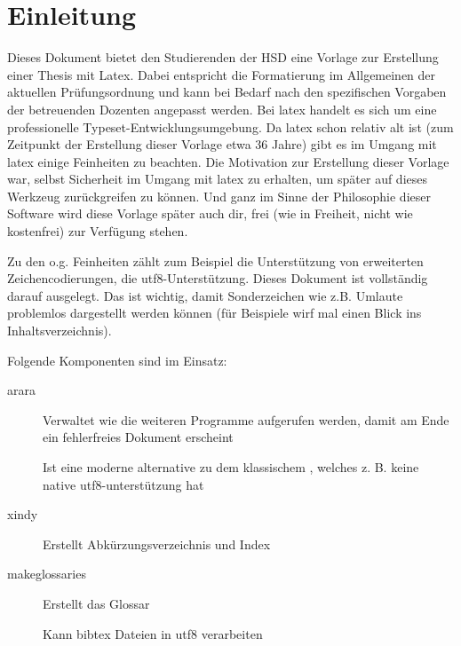 
\newpage

\section{Einleitung}%
\label{sec:einl}
Dieses Dokument bietet den Studierenden der HSD eine Vorlage zur Erstellung einer Thesis mit Latex. Dabei entspricht die Formatierung im Allgemeinen der aktuellen Prüfungsordnung und kann bei Bedarf nach den spezifischen Vorgaben der betreuenden Dozenten angepasst werden. Bei \gls{latex} handelt es sich um eine \glqq professionelle Typeset-Entwicklungsumgebung\grqq. Da \gls{latex} schon relativ alt ist (zum Zeitpunkt der Erstellung dieser Vorlage etwa 36 Jahre) gibt es im Umgang mit \gls{latex} einige Feinheiten zu beachten. Die Motivation zur Erstellung dieser Vorlage war, selbst Sicherheit im Umgang mit \gls{latex} zu erhalten, um später auf dieses Werkzeug zurückgreifen zu können. Und ganz im Sinne der Philosophie dieser Software wird diese Vorlage später auch dir, frei (wie in Freiheit, nicht wie kostenfrei) zur Verfügung stehen.

Zu den o.g. Feinheiten zählt zum Beispiel die Unterstützung von erweiterten Zeichencodierungen, die \gls{utf8}-Unterstützung. Dieses Dokument ist vollständig darauf ausgelegt.
Das ist wichtig, damit Sonderzeichen wie z.B. Umlaute problemlos dargestellt werden können (für Beispiele wirf mal einen Blick ins Inhaltsverzeichnis).

Folgende Komponenten sind im Einsatz:
\begin{description}
  \item[arara] Verwaltet wie die weiteren Programme aufgerufen werden, damit am Ende ein fehlerfreies Dokument erscheint
  \item[\protect{}] Ist eine moderne alternative zu dem klassischem \glqq {}\grqq , welches z. B. keine native \gls{utf8}-unterstützung hat
  \item[xindy] Erstellt Abkürzungsverzeichnis und Index
  \item[makeglossaries] Erstellt das Glossar
  \item[\protect{}] Kann bibtex Dateien in \gls{utf8} verarbeiten
\end{description}

